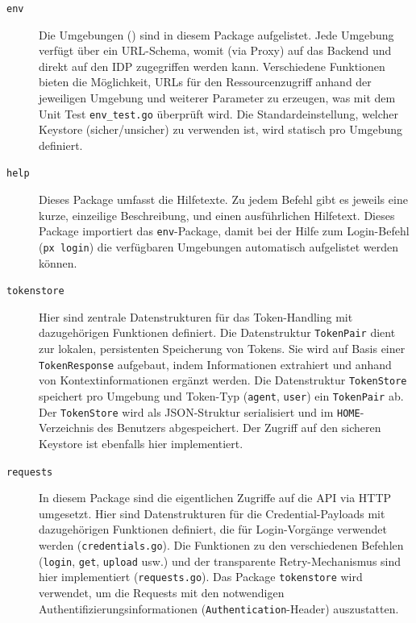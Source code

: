 \begin{description}
    \item[\texttt{env}] Die Umgebungen () sind in diesem Package aufgelistet. Jede Umgebung verfügt über ein URL-Schema, womit (via Proxy) auf das Backend und direkt auf den IDP zugegriffen werden kann. Verschiedene Funktionen bieten die Möglichkeit, URLs für den Ressourcenzugriff anhand der jeweiligen Umgebung und weiterer Parameter zu erzeugen, was mit dem Unit Test \texttt{env\_test.go} überprüft wird. Die Standardeinstellung, welcher Keystore (sicher/unsicher) zu verwenden ist, wird statisch pro Umgebung definiert.
    \item[\texttt{help}] Dieses Package umfasst die Hilfetexte. Zu jedem Befehl gibt es jeweils eine kurze, einzeilige Beschreibung, und einen ausführlichen Hilfetext. Dieses Package importiert das \texttt{env}-Package, damit bei der Hilfe zum Login-Befehl (\texttt{px login}) die verfügbaren Umgebungen automatisch aufgelistet werden können.
    \item[\texttt{tokenstore}] Hier sind zentrale Datenstrukturen für das Token-Handling mit dazugehörigen Funktionen definiert. Die Datenstruktur \texttt{TokenPair} dient zur lokalen, persistenten Speicherung von Tokens. Sie wird auf Basis einer \texttt{TokenResponse} aufgebaut, indem Informationen extrahiert und anhand von Kontextinformationen ergänzt werden. Die Datenstruktur \texttt{TokenStore} speichert pro Umgebung und Token-Typ (\texttt{agent}, \texttt{user}) ein \texttt{TokenPair} ab. Der \texttt{TokenStore} wird als JSON-Struktur serialisiert und im \texttt{HOME}-Verzeichnis des Benutzers abgespeichert. Der Zugriff auf den sicheren Keystore ist ebenfalls hier implementiert.
    \item[\texttt{requests}] In diesem Package sind die eigentlichen Zugriffe auf die API via HTTP umgesetzt. Hier sind Datenstrukturen für die Credential-Payloads mit dazugehörigen Funktionen definiert, die für Login-Vorgänge verwendet werden (\texttt{credentials.go}). Die Funktionen zu den verschiedenen Befehlen (\texttt{login}, \texttt{get}, \texttt{upload} usw.) und der transparente Retry-Mechanismus sind hier implementiert (\texttt{requests.go}). Das Package \texttt{tokenstore} wird verwendet, um die Requests mit den notwendigen Authentifizierungsinformationen (\texttt{Authentication}-Header) auszustatten.

\end{description}
